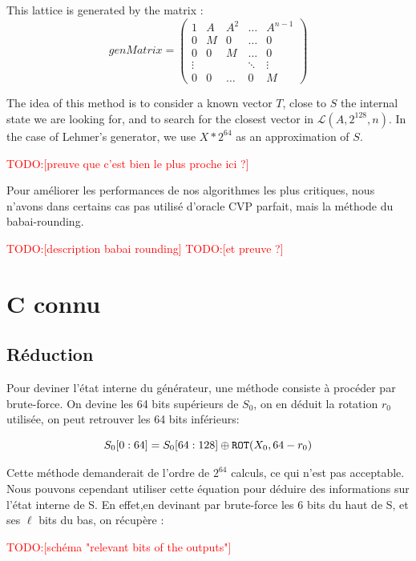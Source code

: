 \documentclass[preprint]{iacrtrans}
\newcommand{\todo}[1]{\textcolor{red}{TODO:[#1]}}
\begin{document}
This lattice is generated by the matrix :
\begin{equation}
genMatrix =
\begin{pmatrix} 
1 & A & A^2 & \dots & A^{n- 1}\\
0 & M & 0 & \dots & 0\\
0 & 0 & M & \dots & 0\\
\vdots & & & \ddots & \vdots\\
0 & 0 & \dots & 0 & M
\end{pmatrix}
\end{equation}

The idea of this method is to consider a known vector $T$, close to $S$ the internal state we are looking for, and to search for the closest vector in $\mathcal{L}(A,2^{128},n)$. In the case of Lehmer's generator, we use $X * 2^{64}$ as an approximation of $S$.

\todo{preuve que c'est bien le plus proche ici ?}

Pour améliorer les performances de nos algorithmes les plus critiques, nous n'avons dans certains cas pas utilisé d'oracle CVP parfait, mais la méthode du babai-rounding. 

\todo{description babai rounding}
\todo{et preuve ?}

\section{C connu}

\subsection{Réduction}
Pour deviner l'état interne du générateur, une méthode consiste à procéder par brute-force. On devine les 64 bits supérieurs de $S_0$, on en déduit la rotation $r_0$ utilisée, on peut retrouver  les 64 bits inférieurs:

\begin{equation}
   S_0[0:64] = S_0[64:128] \oplus \texttt{ROT}(X_0 , 64 - r_0) \\
\end{equation}

Cette méthode demanderait de l'ordre de $2^{64}$ calculs, ce qui n'est pas acceptable. Nous pouvons cependant utiliser cette équation pour déduire des informations sur l'état interne de S. En effet,en devinant par brute-force les 6 bits du haut de S, et ses $\ell$ bits du bas, on récupère :

\todo{schéma "relevant bits of the outputs"}
\end{document}

